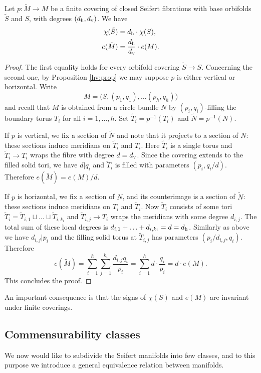\begin{prop} \label{e:prop}
Let $p\colon \tilde M \to M$ be a finite covering of closed Seifert fibrations with base orbifolds $\tilde S$ and $S$, with degrees $(d_{\rm h}, d_{\rm v})$. We have
\begin{align*}
\chi(\tilde S) & = d_{\rm h} \cdot \chi (S), \\
e(\tilde M ) & = \frac{d_{\rm h}}{d_{\rm v}} \cdot e(M).
\end{align*}
\end{prop}
\begin{proof}
The first equality holds for every orbifold covering $\tilde S \to S$.
Concerning the second one, by Proposition \ref{hv:prop} we may suppose $p$ is either vertical or horizontal. Write
$$M = \big(S, (p_1,q_1), \ldots (p_h, q_h)\big)$$
and recall that $M$ is obtained from a circle bundle $N$ by $(p_i,q_i)$-filling the boundary torus $T_i$ for all $i=1,\ldots, h$. Set $\tilde T_i = p^{-1}(T_i)$ and $\tilde N = p^{-1}(N)$.

If $p$ is vertical, we fix a section of $\tilde  N$ and note that it projects to a section of $N$: these sections induce meridians on $\tilde T_i$ and $T_i$. Here $\tilde T_i$ is a single torus and $\tilde T_i \to T_i$ wraps the fibre with degree $d=d_{\rm v}$. Since the covering extends to the filled solid tori, we have $d|q_i$ and $\tilde T_i$ is filled with parameters $(p_i,q_i/d)$. Therefore $e(\tilde M) = e(M)/d$.

If $p$ is horizontal, we fix a section of $N$, and its counterimage is a section of $\tilde N$: these sections induce meridians on $T_i$ and $\tilde T_i$.
Now $\tilde T_i$ consists of some tori $\tilde T_i = \tilde T_{i,1} \sqcup \ldots \sqcup \tilde T_{i,k_i}$ and $\tilde T_{i,j} \to T_i$ wraps the meridians with some degree $d_{i,j}$. The total sum of these local degrees is $d_{i,1}+\ldots +d_{i,k_i}=d = d_{\rm h}$. Similarly as above we have $d_{i,j}|p_i$ and the filling solid torus at $\tilde T_{i,j}$ has parameters $(p_i/d_{i,j},q_i)$. Therefore 
$$e(\tilde M) = \sum_{i=1}^h \sum_{j=1}^{k_i} \frac{d_{i,j}q_i}{p_i} = \sum_{i=1}^h d\cdot \frac{q_i}{p_i} = d \cdot e(M).$$
This concludes the proof.
\end{proof}

An important consequence is that the signs of $\chi(S)$ and $e(M)$ are invariant under finite coverings. 

\subsection{Commensurability classes} \label{commensurability:Seifert:subsection}
We now would like to subdivide the Seifert manifolds into few classes, and to this purpose we introduce a general equivalence relation between manifolds.

